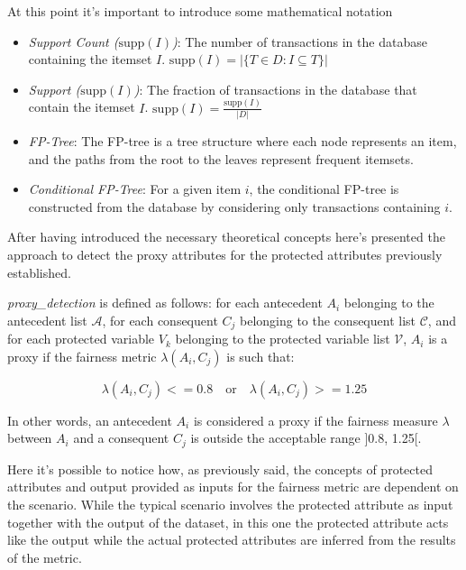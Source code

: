 \begin{enumerate}
\begin{itemize}
        \end{itemize}

        At this point it's important to introduce some mathematical notation

        \begin{itemize}

            \item \emph{Support Count ($\text{supp}(I)$)}: The number of transactions in the database containing the itemset $I$. $\text{supp}(I) = |\{T \in D : I \subseteq T\}|$ 

            \item \emph{Support ($\text{supp}(I)$)}: The fraction of transactions in the database that contain the itemset $I$. $\text{supp}(I) = \frac{\text{supp}(I)}{|D|}$

            \item \emph{FP-Tree}: The FP-tree is a tree structure where each node represents an item, and the paths from the root to the leaves represent frequent itemsets.

            \item \emph{Conditional FP-Tree}: For a given item $i$, the conditional FP-tree is constructed from the database by considering only transactions containing $i$.

        \end{itemize}

\end{enumerate}

After having introduced the necessary theoretical concepts here's presented the approach to detect the proxy attributes for the protected attributes previously established.

\textit{proxy\_detection} is defined as follows: for each antecedent \( A_i \) belonging to the antecedent list \( \mathcal{A} \), for each consequent \( C_j \) belonging to the consequent list \( \mathcal{C} \), and for each protected variable \( V_k \) belonging to the protected variable list \( \mathcal{V} \), \( A_i \) is a proxy if the fairness metric \( \lambda(A_i, C_j) \) is such that:

\[\lambda(A_i, C_j) <= 0.8 \quad \text{or} \quad \lambda(A_i, C_j) >= 1.25\]

In other words, an antecedent \( A_i \) is considered a proxy if the fairness measure \( \lambda \) between \( A_i \) and a consequent \( C_j \) is outside the acceptable range ]0.8, 1.25[.

Here it's possible to notice how, as previously said, the concepts of protected attributes and output provided as inputs for the fairness metric are dependent on the scenario. While the typical scenario involves the protected attribute as input together with the output of the dataset, in this one the protected attribute acts like the output while the actual protected attributes are inferred from the results of the metric.

